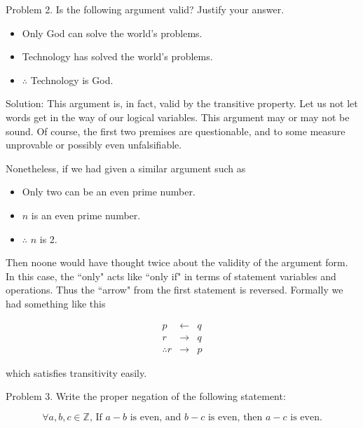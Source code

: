 \documentclass[16 pt]{amsart}
\theoremstyle{definition}
\theoremstyle{remark}
\numberwithin{equation}{subsection}
\newcommand{\Z}{\mathbb{Z}}
\begin{document}
\newpage
Problem 2. Is the following argument valid?  Justify your answer.\\


\begin{itemize}
\item[] Only God can solve the world's problems.\\
\item[] Technology has solved the world's problems.\\
\item[] $\therefore$ Technology is God.
\end{itemize}


\vspace{1in}

Solution: This argument is, in fact, valid by the transitive property.  Let us not let words get in the way of our logical variables.  This argument may or may not be sound.  Of course, the first two premises are questionable, and to some measure unprovable or possibly even unfalsifiable.

Nonetheless, if we had given a similar argument such as

\begin{itemize}
\item[] Only two can be an even prime number.\\
\item[] $n$ is an even prime number.\\
\item[] $\therefore$ $n$ is 2.
\end{itemize}

Then noone would have thought twice about the validity of the argument form.  In this case, the ``only" acts like ``only if" in terms of statement variables and operations.  Thus the ``arrow" from the first statement is reversed.  Formally we had something like this

\begin{eqnarray*}
p & \leftarrow & q\\
r & \rightarrow & q\\
\therefore r & \rightarrow & p
\end{eqnarray*}

which satisfies transitivity easily.


\newpage

Problem 3. Write the proper negation of the following statement:

\[
\forall a,b,c\in\Z \text{, If } a-b \text{ is even, and } b-c \text{ is even, then } a-c \text{ is even.}
\]
\end{document}
